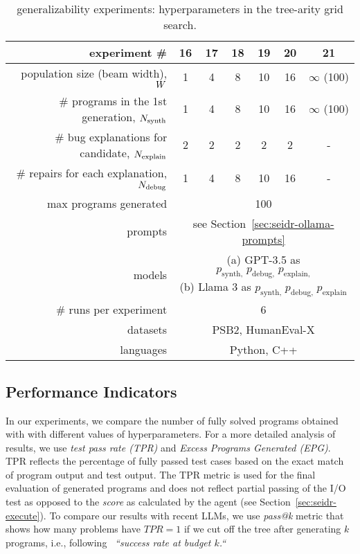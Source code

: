 \begin{table}[t]
\setlength{\tabcolsep}{10pt}
\centering
\caption{\method{} generalizability experiments: hyperparameters in the tree-arity grid search.}\small
\label{tab:w-n-generalizability}
\begin{tabular}{rcccccc}
\toprule
experiment \# & 16 & 17 & 18 & 19 & 20 & 21\\
\midrule
population size (beam width), $W{}$ & 1 & 4 & 8 & 10 & 16 & $\infty$ (100) \\[4pt]
\# programs in the 1st generation, $N_\text{synth}{}$ & 1 & 4 & 8 & 10 & 16 & $\infty$ (100) \\[4pt]
\# bug explanations for candidate, $N_\text{explain}{}$ & 2 & 2 & 2 & 2 & 2 & - \\[4pt]
\# repairs for each explanation, $N_\text{debug}{}$ & 1 & 4 & 8 & 10 & 16 & - \\[4pt]
\midrule
max programs generated & \multicolumn{6}{c}{100} \\[4pt]
prompts & \multicolumn{6}{c}{see Section~\ref{sec:seidr-ollama-prompts}} \\[4pt]
models  & \multicolumn{6}{c}{
 \parbox{5cm}{
     (a) GPT-3.5 as $p_\text{synth,} \; p_\text{debug,} \; p_\text{explain,}$ \\
     (b) Llama 3 as $p_\text{synth,} \; p_\text{debug,} \; p_\text{explain}$
     }
} \\[10pt]
\midrule
\# runs per experiment &  \multicolumn{6}{c}{6} \\[4pt]
datasets  & \multicolumn{6}{c}{PSB2, HumanEval-X} \\[4pt] 
languages  & \multicolumn{6}{c}{Python, C++} \\[4pt]
\bottomrule
\end{tabular}
\end{table}

\subsection{Performance Indicators}
\label{sec:seidr-metrics}

\sloppy %
In our experiments, we compare 
the number of fully solved programs obtained with \method{} with different values of hyperparameters. 
For a more detailed analysis of results, we use \emph{test pass rate (TPR)} and \emph{Excess Programs Generated (EPG)}.
TPR reflects the percentage of fully passed test cases based on the exact match of program output and test output. 
The TPR metric is used for the final evaluation of generated programs and does not reflect partial passing of the I/O test as opposed to the \emph{score} as calculated by the \rank{} agent (see Section~\ref{sec:seidr-execute}). 
To compare our results with recent LLMs, we use \emph{pass@k} metric that shows how many problems have $TPR=1$ if we cut off the tree after generating $k$ programs, i.e., following~\citet{kulal2019:spoc} \emph{``success rate at budget $k$.``}

